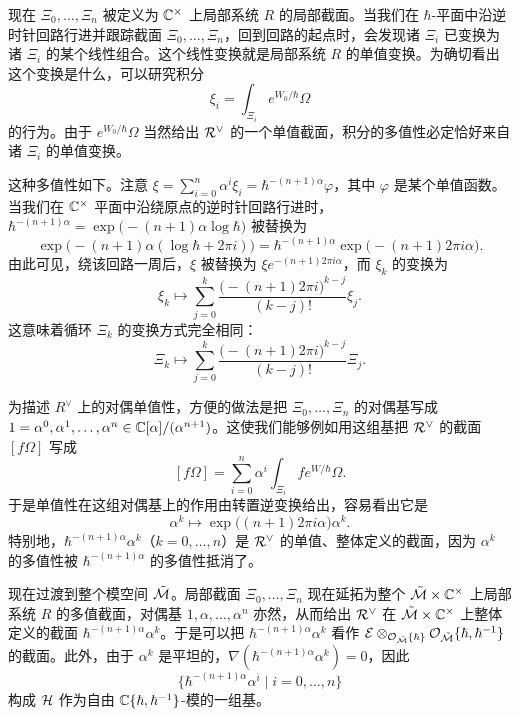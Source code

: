 
现在 $\Xi_0,\ldots,\Xi_n$ 被定义为 $\mathbb{C}^\times$ 上局部系统 $R$ 的局部截面。当我们在 $\hbar$-平面中沿逆时针回路行进并跟踪截面 $\Xi_0,\ldots,\Xi_n$，回到回路的起点时，会发现诸 $\Xi_i$ 已变换为诸 $\Xi_i$ 的某个线性组合。这个线性变换就是局部系统 $R$ 的单值变换。为确切看出这个变换是什么，可以研究积分
\[
  \xi_i=\int_{\Xi_i}e^{W_0/\hbar}\Omega
\]
的行为。由于 $e^{W_0/\hbar}\Omega$ 当然给出 $\mathcal{R}^\vee$ 的一个单值截面，积分的多值性必定恰好来自诸 $\Xi_i$ 的单值变换。

这种多值性如下。注意 $\xi=\sum_{i=0}^{n}\alpha^{i}\xi_i=\hbar^{-(n+1)\alpha}\varphi$，其中 $\varphi$ 是某个单值函数。当我们在 $\mathbb{C}^\times$ 平面中沿绕原点的逆时针回路行进时，$\hbar^{-(n+1)\alpha}=\exp\bigl(-(n+1)\alpha\log\hbar\bigr)$ 被替换为
\[
  \exp\bigl(-(n+1)\alpha(\log\hbar+2\pi i)\bigr)
  =\hbar^{-(n+1)\alpha}\exp\bigl(-(n+1)2\pi i\alpha\bigr).
\]
由此可见，绕该回路一周后，$\xi$ 被替换为 $\xi e^{-(n+1)2\pi i\alpha}$，而 $\xi_k$ 的变换为
\[
  \xi_k\mapsto\sum_{j=0}^{k}
  \frac{\bigl(-(n+1)2\pi i\bigr)^{k-j}}{(k-j)!}\xi_j.
\]
这意味着循环 $\Xi_k$ 的变换方式完全相同：
\[
  \Xi_k\mapsto\sum_{j=0}^{k}
  \frac{\bigl(-(n+1)2\pi i\bigr)^{k-j}}{(k-j)!}\Xi_j.
\]

为描述 $R^\vee$ 上的对偶单值性，方便的做法是把 $\Xi_0,\ldots,\Xi_n$ 的对偶基写成 $1=\alpha^{0},\alpha^{1},\ldots,\alpha^{n}\in\mathbb{C}[\alpha]/(\alpha^{n+1})$。这使我们能够例如用这组基把 $\mathcal{R}^\vee$ 的截面 $[f\Omega]$ 写成
\[
  [f\Omega]=\sum_{i=0}^{n}\alpha^{i}\int_{\Xi_i}fe^{W/\hbar}\Omega.
\]
于是单值性在这组对偶基上的作用由转置逆变换给出，容易看出它是
\[
  \alpha^{k}\mapsto\exp\bigl((n+1)2\pi i\alpha\bigr)\alpha^{k}.
\]
特别地，$\hbar^{-(n+1)\alpha}\alpha^{k}$（$k=0,\ldots,n$）是 $\mathcal{R}^\vee$ 的单值、整体定义的截面，因为 $\alpha^{k}$ 的多值性被 $\hbar^{-(n+1)\alpha}$ 的多值性抵消了。

现在过渡到整个模空间 $\tilde{\mathcal{M}}$。局部截面 $\Xi_0,\ldots,\Xi_n$ 现在延拓为整个 $\tilde{\mathcal{M}}\times\mathbb{C}^\times$ 上局部系统 $R$ 的多值截面，对偶基 $1,\alpha,\ldots,\alpha^{n}$ 亦然，从而给出 $\mathcal{R}^\vee$ 在 $\tilde{\mathcal{M}}\times\mathbb{C}^\times$ 上整体定义的截面 $\hbar^{-(n+1)\alpha}\alpha^{k}$。于是可以把 $\hbar^{-(n+1)\alpha}\alpha^{k}$ 看作 $\mathcal{E}\otimes_{\mathcal{O}_{\tilde{\mathcal{M}}}\{\hbar\}}\mathcal{O}_{\tilde{\mathcal{M}}}\{\hbar,\hbar^{-1}\}$ 的截面。此外，由于 $\alpha^{k}$ 是平坦的，$\nabla(\hbar^{-(n+1)\alpha}\alpha^{k})=0$，因此
\[
  \bigl\{\hbar^{-(n+1)\alpha}\alpha^{i}\mid i=0,\ldots,n\bigr\}
\]
构成 $\mathcal{H}$ 作为自由 $\mathbb{C}\{\hbar,\hbar^{-1}\}$-模的一组基。


